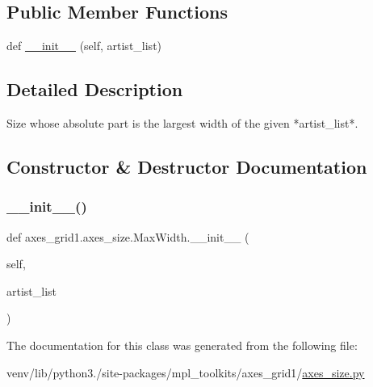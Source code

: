 \subsection*{Public Member Functions}
\begin{DoxyCompactItemize}
\item 
def \hyperlink{classaxes__grid1_1_1axes__size_1_1MaxWidth_abfde44034087a549c4389fe99a0bde85}{\+\_\+\+\_\+init\+\_\+\+\_\+} (self, artist\+\_\+list)
\end{DoxyCompactItemize}


\subsection{Detailed Description}
\begin{DoxyVerb}Size whose absolute part is the largest width of the given *artist_list*.
\end{DoxyVerb}
 

\subsection{Constructor \& Destructor Documentation}
\mbox{\label{classaxes__grid1_1_1axes__size_1_1MaxWidth_abfde44034087a549c4389fe99a0bde85}} 
\subsubsection{\texorpdfstring{\+\_\+\+\_\+init\+\_\+\+\_\+()}{\_\_init\_\_()}}
{\footnotesize\ttfamily def axes\+\_\+grid1.\+axes\+\_\+size.\+Max\+Width.\+\_\+\+\_\+init\+\_\+\+\_\+ (\begin{DoxyParamCaption}\item[{}]{self,  }\item[{}]{artist\+\_\+list }\end{DoxyParamCaption})}



The documentation for this class was generated from the following file\+:\begin{DoxyCompactItemize}
\item 
venv/lib/python3./site-\/packages/mpl\+\_\+toolkits/axes\+\_\+grid1/\hyperlink{_2axes__size_8py}{axes\+\_\+size.\+py}\end{DoxyCompactItemize}
